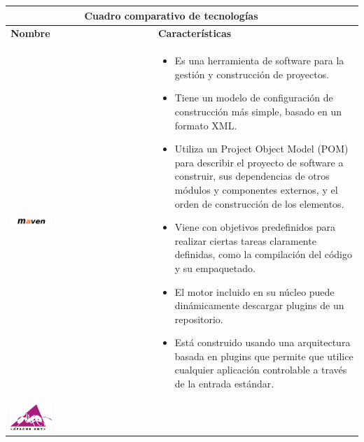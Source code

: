 \newpage
\begin{table}[b!]
    \centering
    \vspace{-30mm}
      \begin{tabular}{|p{2cm}|ll}
        \hline
        \multicolumn{2}{|c|}{{\bf Cuadro comparativo de tecnologías}} \\ 
        \hline
          \multicolumn{1}{|p{4cm}|}{{\bf Nombre}} & 
		  \multicolumn{1}{p{10cm}|}{{\bf Características}}\\
        \hline
          \multicolumn{1}{|p{5cm}|}{\includegraphics[width=0.3\textwidth]{images/maven}} & 
          \multicolumn{2}{p{10cm}|}{\begin{itemize}
          \vspace{-10mm}
        \item Es una herramienta de software para la gestión y construcción de proyectos.
        \item Tiene un modelo de configuración de construcción más simple, basado en un formato XML.
        \item Utiliza un Project Object Model (POM) para describir el proyecto de software a construir, sus dependencias de otros 				módulos y componentes externos, y el orden de construcción de los elementos.
        \item  Viene con objetivos predefinidos para realizar ciertas tareas claramente definidas, como la compilación del código y su 		empaquetado.
        \item El motor incluido en su núcleo puede dinámicamente descargar plugins de un repositorio.
        \item Está construido usando una arquitectura basada en plugins que permite que utilice cualquier aplicación controlable a través de la entrada estándar. 
       \cite{36}
      \end{itemize}} \\
        \hline
          \multicolumn{1}{|p{5cm}|}{\includegraphics[width=0.3\textwidth]{images/ant}} & 
          \multicolumn{1}{p{10cm}|}{
          \begin{itemize}

\end{itemize}}
\end{tabular}
\end{table}
